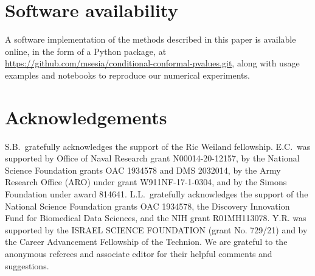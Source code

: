 \section*{Software availability}

A software implementation of the methods described in this paper is available online, in the form of a Python package, at
\url{https://github.com/msesia/conditional-conformal-pvalues.git}, along with usage examples and notebooks to reproduce our numerical experiments.

\section*{Acknowledgements}

S.B.~gratefully acknowledges the support of the Ric Weiland fellowship. E.C.~was supported by Office of Naval Research grant N00014-20-12157, by the National Science Foundation grants OAC 1934578 and DMS 2032014, by the Army Research Office (ARO) under grant W911NF-17-1-0304, and by the Simons Foundation under award 814641.
 L.L.~gratefully acknowledges the support of the National Science Foundation grants OAC 1934578, the Discovery Innovation Fund for Biomedical Data Sciences, and the NIH grant R01MH113078.  Y.R. was supported by the ISRAEL SCIENCE FOUNDATION (grant No. 729/21) and by the Career Advancement Fellowship of the Technion.
We are grateful to the anonymous referees and associate editor for their helpful comments and suggestions.

\printbibliography

\appendix

\renewcommand{\thefigure}{A\arabic{figure}}
\setcounter{figure}{0}
\renewcommand{\thetable}{A\arabic{table}}
\setcounter{table}{0}



